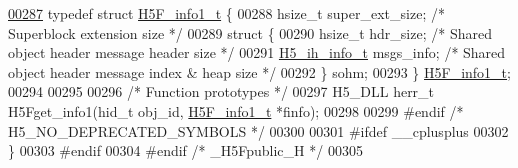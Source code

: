 \begin{DoxyCode}
\hyperlink{struct_h5_f__info1__t}{00287} \textcolor{keyword}{typedef} \textcolor{keyword}{struct }\hyperlink{struct_h5_f__info1__t}{H5F\_info1\_t} \{
00288     hsize\_t     super\_ext\_size; \textcolor{comment}{/* Superblock extension size */}
00289     \textcolor{keyword}{struct }\{
00290     hsize\_t     hdr\_size;       \textcolor{comment}{/* Shared object header message header size */}
00291     \hyperlink{struct_h5__ih__info__t}{H5\_ih\_info\_t}    msgs\_info;      \textcolor{comment}{/* Shared object header message index & heap size */}
00292     \} sohm;
00293 \} \hyperlink{struct_h5_f__info1__t}{H5F\_info1\_t};
00294 
00295 
00296 \textcolor{comment}{/* Function prototypes */}
00297 H5\_DLL herr\_t H5Fget\_info1(hid\_t obj\_id, \hyperlink{struct_h5_f__info1__t}{H5F\_info1\_t} *finfo);
00298 
00299 \textcolor{preprocessor}{#endif }\textcolor{comment}{/* H5\_NO\_DEPRECATED\_SYMBOLS */}\textcolor{preprocessor}{}
00300 
00301 \textcolor{preprocessor}{#ifdef \_\_cplusplus}
00302 \}
00303 \textcolor{preprocessor}{#endif}
00304 \textcolor{preprocessor}{#endif }\textcolor{comment}{/* \_H5Fpublic\_H */}\textcolor{preprocessor}{}
00305 
\end{DoxyCode}
